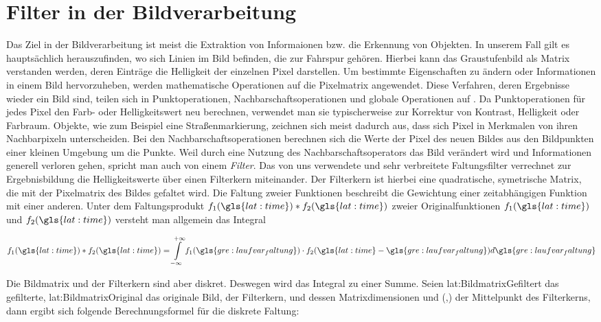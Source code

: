\section{Filter in der Bildverarbeitung} \label{sec:filter}

Das Ziel in der Bildverarbeitung ist meist die Extraktion von Informaionen bzw. die Erkennung von Objekten. In unserem Fall gilt es hauptsächlich herauszufinden, wo sich Linien im Bild befinden, die zur Fahrspur gehören. Hierbei kann das Graustufenbild als Matrix verstanden werden, deren Einträge die Helligkeit der einzelnen Pixel darstellen. Um bestimmte Eigenschaften zu ändern oder Informationen in einem Bild hervorzuheben, werden mathematische Operationen auf die Pixelmatrix angewendet. Diese Verfahren, deren Ergebnisse wieder ein Bild sind, teilen sich in Punktoperationen, Nachbarschaftsoperationen und globale Operationen auf \autocite{jaehneDigitaleBildverarbeitungMit2005}. Da Punktoperationen für jedes Pixel den Farb- oder Helligkeitswert neu berechnen, verwendet man sie typischerweise zur Korrektur von Kontrast, Helligkeit oder Farbraum. Objekte, wie zum Beispiel eine Straßenmarkierung, zeichnen sich meist dadurch aus, dass sich Pixel in Merkmalen von ihren Nachbarpixeln unterscheiden. Bei den Nachbarschaftsoperationen berechnen sich die Werte der Pixel des neuen Bildes aus den Bildpunkten einer kleinen Umgebung um die Punkte. Weil durch eine Nutzung des Nachbarschaftsoperators das Bild verändert wird und Informationen generell verloren gehen, spricht man auch von einem \emph{Filter}. Das von uns verwendete und sehr verbreitete Faltungsfilter verrechnet zur Ergebnisbildung die Helligkeitswerte über einen Filterkern miteinander. Der Filterkern ist hierbei eine quadratische, symetrische Matrix, die mit der Pixelmatrix des Bildes gefaltet wird. Die Faltung zweier Funktionen beschreibt die Gewichtung einer zeitabhängigen Funktion mit einer anderen. Unter dem Faltungsprodukt \( f_1(\gls{lat:time}) \ast f_2(\gls{lat:time}) \) zweier Originalfunktionen \(f_1(\gls{lat:time}) \) und \(f_2(\gls{lat:time}) \) versteht man allgemein das Integral \autocite{papulaMathematikFuerIngenieure}

\begin{equation}
f_1(\gls{lat:time}) \ast f_2(\gls{lat:time}) = \int \limits_{-\infty}^{+\infty} f_1(\gls{gre:laufvar_faltung}) \cdot f_2(\gls{lat:time}-\gls{gre:laufvar_faltung})d\gls{gre:laufvar_faltung}
\end{equation}

 Die Bildmatrix und der Filterkern sind aber diskret. Deswegen wird das Integral zu einer Summe. Seien \gls{lat:BildmatrixGefiltert} das gefilterte, \gls{lat:BildmatrixOriginal} das originale Bild,  der Filterkern,  und  dessen Matrixdimensionen und (,) der Mittelpunkt des Filterkerns, dann ergibt sich folgende Berechnungsformel für die diskrete Faltung:

